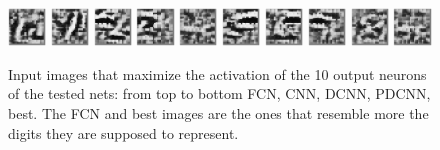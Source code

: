 \documentclass[a4paper, 11pt]{article}
\begin{document}
\begin{figure}[H]
      \includegraphics[width=0.09\textwidth]{img/classification/BN_b0.png}
      \includegraphics[width=0.09\textwidth]{img/classification/BN_b1.png}
      \includegraphics[width=0.09\textwidth]{img/classification/BN_b2.png}
      \includegraphics[width=0.09\textwidth]{img/classification/BN_b3.png}
      \includegraphics[width=0.09\textwidth]{img/classification/BN_b4.png}
      \includegraphics[width=0.09\textwidth]{img/classification/BN_b5.png}
      \includegraphics[width=0.09\textwidth]{img/classification/BN_b6.png}
      \includegraphics[width=0.09\textwidth]{img/classification/BN_b7.png}
      \includegraphics[width=0.09\textwidth]{img/classification/BN_b8.png}
      \includegraphics[width=0.09\textwidth]{img/classification/BN_b9.png}

      \caption{Input images that maximize the activation of the 10 output neurons of the tested nets: from top to bottom FCN, CNN, DCNN, PDCNN, best. The FCN and best images are the ones that resemble more the digits they are supposed to represent.}
      \label{fig:c:act}
    \end{figure}
\end{document}
